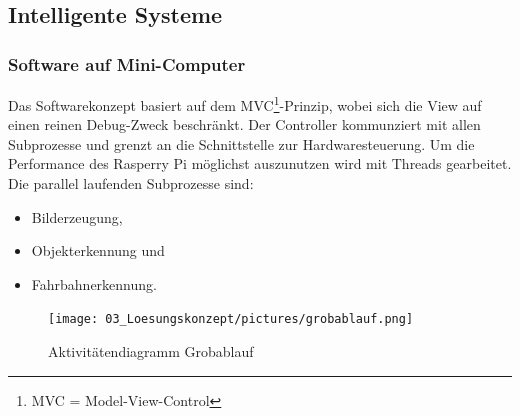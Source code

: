\subsection{Intelligente Systeme}

\subsubsection{Software auf Mini-Computer}
Das Softwarekonzept basiert auf dem MVC\footnote{MVC = Model-View-Control}-Prinzip, wobei sich die View auf einen reinen Debug-Zweck beschränkt. Der Controller kommunziert mit allen Subprozesse und grenzt an die Schnittstelle zur Hardwaresteuerung. Um die Performance des Rasperry Pi möglichst auszunutzen wird mit Threads gearbeitet. Die parallel laufenden Subprozesse sind:

\begin{itemize}
\item Bilderzeugung,
\item Objekterkennung und
\item Fahrbahnerkennung.
\end{itemize}

\begin{figure}[H]
	\centering
	\texttt{[image: 03\_Loesungskonzept/pictures/grobablauf.png]}
	\caption{Aktivitätendiagramm Grobablauf}
\end{figure}

